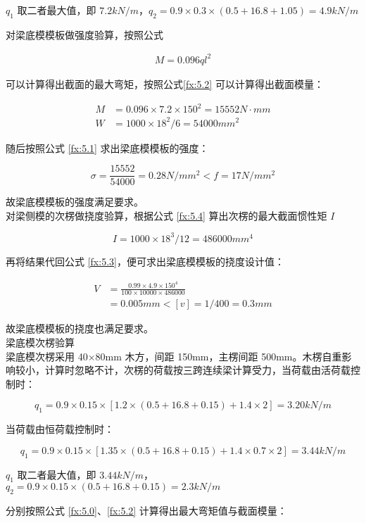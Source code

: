 $q_1$ 取二者最大值，即 $7.2 kN/m$，$q_2=0.9\times 0.3\times (0.5+16.8+1.05)=4.9 kN/m$

对梁底模模板做强度验算，按照公式

\begin{align}
    \label{fx:5.X}
    M=0.096ql^2
\end{align}

可以计算得出截面的最大弯矩，按照公式\ref{fx:5.2} 可以计算得出截面模量：

\begin{align*}
    M&=0.096\times 7.2\times 150^2=15552 N \cdot mm\\
    W&=1000\times 18^2 /6=54000 mm^2
\end{align*}

随后按照公式 \ref{fx:5.1} 求出梁底模模板的强度：

\[
    \sigma = \frac{15552}{54000}=0.28 N/mm^2< f=17N/mm^2
\]

故梁底模模板的强度满足要求。\\

对梁侧模的次楞做挠度验算，根据公式 \ref{fx:5.4} 算出次楞的最大截面惯性矩 $I$

\[
    I=1000\times 18^3 /12=486000 mm^4
\]

再将结果代回公式 \ref{fx:5.3}，便可求出梁底模模板的挠度设计值：

\begin{align*}
    V&=\frac{0.99\times 4.9 \times 150^4}{100\times 10000\times 486000}\\
    &=0.005 mm<[v]=1/400=0.3mm
\end{align*}

故梁底模模板的挠度也满足要求。\\

 梁底模次楞验算\\

梁底模次楞采用 40×80mm 木方，间距 150mm，主楞间距 500mm。木楞自重影响较小，计算时忽略不计，次楞的荷载按三跨连续梁计算受力，当荷载由活荷载控制时：

\[q_1=0.9\times 0.15\times [1.2\times (0.5+16.8+0.15)+1.4\times 2]=3.20 kN/m\]

当荷载由恒荷载控制时：

\[q_1=0.9\times 0.15\times [1.35\times (0.5+16.8+0.15)+1.4\times0.7\times 2]=3.44 kN/m\]

$q_1$ 取二者最大值，即 $3.44 kN/m$，$q_2=0.9\times 0.15\times (0.5+16.8+0.15)=2.3 kN/m$

分别按照公式 \ref{fx:5.0}、\ref{fx:5.2} 计算得出最大弯矩值与截面模量：

